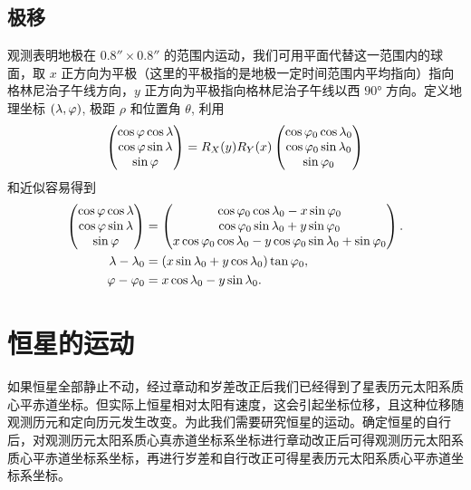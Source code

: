 \documentclass[UTF8, 12pt, a4paper, oneside, onecolumn, fontset=none]{ctexart}
\begin{document}
\subsection{极移}
观测表明地极在 $\ang{;; 0.8}\times\ang{;; 0.8}$ 的范围内运动，我们可用平面代替这一范围内的球面，取 $x$ 正方向为平极（这里的平极指的是地极一定时间范围内平均指向）指向格林尼治子午线方向，$y$ 正方向为平极指向格林尼治子午线以西 $\ang{90;;}$ 方向。定义地理坐标 $\mleft(\lambda,\varphi\mright)$, 极距 $\rho$ 和位置角 $\theta$, 利用
\begin{equation}
\begin{pmatrix}
\cos{\varphi}\cos{\lambda}\\
\cos{\varphi}\sin{\lambda}\\
\sin{\varphi}
\end{pmatrix}=R_{X}\mleft(y\mright) R_{Y}\mleft(x\mright)
\begin{pmatrix}
\cos{\varphi_{0}}\cos{\lambda_{0}}\\
\cos{\varphi_{0}}\sin{\lambda_{0}}\\
\sin{\varphi_{0}}
\end{pmatrix}
\end{equation}
和近似容易得到
\begin{align}
\begin{pmatrix}
\cos{\varphi}\cos{\lambda}\\
\cos{\varphi}\sin{\lambda}\\
\sin{\varphi}
\end{pmatrix}&=
\begin{pmatrix}
\cos{\varphi_{0}}\cos{\lambda_{0}}-x\sin{\varphi_{0}}\\
\cos{\varphi_{0}}\sin{\lambda_{0}}+y\sin{\varphi_{0}}\\
x\cos{\varphi_{0}}\cos{\lambda_{0}}-y\cos{\varphi_{0}}\sin{\lambda_{0}}+\sin{\varphi_{0}}
\end{pmatrix}.\\
\lambda-\lambda_{0}&=\mleft(x\sin{\lambda_{0}}+y\cos{\lambda_{0}}\mright)\tan{\varphi_{0}},\\
\varphi-\varphi_{0}&=x\cos{\lambda_{0}}-y\sin{\lambda_{0}}.
\end{align}

\newpage
\section{恒星的运动}
如果恒星全部静止不动，经过章动和岁差改正后我们已经得到了星表历元太阳系质心平赤道坐标。但实际上恒星相对太阳有速度，这会引起坐标位移，且这种位移随观测历元和定向历元发生改变。为此我们需要研究恒星的运动。确定恒星的自行后，对观测历元太阳系质心真赤道坐标系坐标进行章动改正后可得观测历元太阳系质心平赤道坐标系坐标，再进行岁差和自行改正可得星表历元太阳系质心平赤道坐标系坐标。
\end{document}
